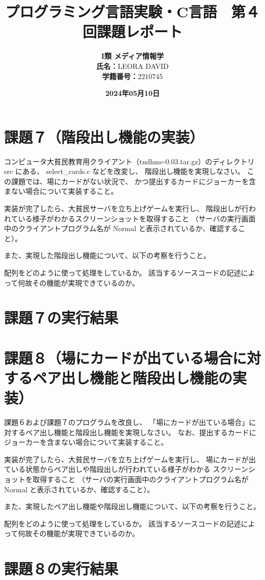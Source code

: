 \documentclass[]{jsarticle}
\title{\vspace{-3cm} \textbf{プログラミング言語実験・C言語　第４回課題レポート}}
\author{\textbf{I類 メディア情報学} \\\textbf{氏名：}LEORA DAVID\\\textbf{学籍番号：}2210745}
\date{\textbf{2024年05月10日}}
\begin{document}
\maketitle

\section*{課題７（階段出し機能の実装）}
コンピュータ大貧民教育用クライアント（tndhmc-0.03.tar.gz）のディレクトリ src にある、 select\_cards.c などを改変し、
階段出し機能を実現しなさい。
この課題では、場にカードがない状況で、 かつ提出するカードにジョーカーを含まない場合について実装すること。

実装が完了したら、大貧民サーバを立ち上げゲームを実行し、 階段出しが行われている様子がわかるスクリーンショットを取得すること
（サーバの実行画面中のクライアントプログラム名が Normal と表示されているか、確認すること）。

また、実現した階段出し機能について、以下の考察を行うこと。

配列をどのように使って処理をしているか。
該当するソースコードの記述によって何故その機能が実現できているのか。

\section*{課題７の実行結果}


\newpage
\section*{課題８（場にカードが出ている場合に対するペア出し機能と階段出し機能の実装）}
課題６および課題７のプログラムを改良し、 「場にカードが出ている場合」に対するペア出し機能と階段出し機能を実現しなさい。
なお、提出するカードにジョーカーを含まない場合について実装すること。

実装が完了したら、大貧民サーバを立ち上げゲームを実行し、 場にカードが出ている状態からペア出しや階段出しが行われている様子がわかる
スクリーンショットを取得すること （サーバの実行画面中のクライアントプログラム名が Normal と表示されているか、確認すること）。

また、実現したペア出し機能や階段出し機能について、以下の考察を行うこと。

配列をどのように使って処理をしているか。
該当するソースコードの記述によって何故その機能が実現できているのか。

\section*{課題８の実行結果}
\end{document}

